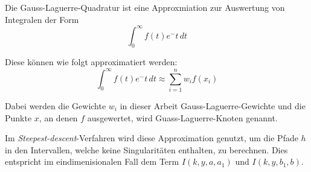 Die Gauss-Laguerre-Quadratur ist eine Approxmiation zur Auswertung von Integralen der Form
\begin{equation}
    \int_{0}^{\infty} f(t) e^-t  \,dt 
\end{equation}

Diese können wie folgt approximatiert werden:
\begin{equation}
    \int_{0}^{\infty} f(t) e^-t  \,dt  \approx \sum_{i = 1}^{n} w_if(x_i) 
\end{equation}

Dabei werden die Gewichte $w_i$ in dieser Arbeit Gauss-Laguerre-Gewichte und die Punkte $x$, an denen $f$ ausgewertet, wird Guass-Laguerre-Knoten genannt.

Im \textit{Steepest-descent}-Verfahren wird diese Approximation genutzt, um die Pfade $h$ in den Intervallen, welche keine Singularitäten enthalten, zu berechnen.
Dies entspricht im eindimenisionalen Fall dem Term $I(k,y,a,a_1)$ und $I(k,y,b_1,b)$.
